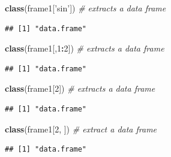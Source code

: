\documentclass[]{book}
\newenvironment{Shaded}{\begin{snugshade}}{\end{snugshade}}
\newcommand{\CommentTok}[1]{\textcolor[rgb]{0.56,0.35,0.01}{\textit{#1}}}
\newcommand{\DecValTok}[1]{\textcolor[rgb]{0.00,0.00,0.81}{#1}}
\newcommand{\KeywordTok}[1]{\textcolor[rgb]{0.13,0.29,0.53}{\textbf{#1}}}
\newcommand{\NormalTok}[1]{#1}
\newcommand{\OperatorTok}[1]{\textcolor[rgb]{0.81,0.36,0.00}{\textbf{#1}}}
\newcommand{\StringTok}[1]{\textcolor[rgb]{0.31,0.60,0.02}{#1}}
\theoremstyle{definition}
\theoremstyle{definition}
\theoremstyle{definition}
\theoremstyle{remark}
\begin{document}
\begin{Shaded}
\begin{Highlighting}[]
\KeywordTok{class}\NormalTok{(frame1[}\StringTok{'sin'}\NormalTok{])  }\CommentTok{# extracts a data frame}
\end{Highlighting}
\end{Shaded}

\begin{verbatim}
## [1] "data.frame"
\end{verbatim}

\begin{Shaded}
\begin{Highlighting}[]
\KeywordTok{class}\NormalTok{(frame1[,}\DecValTok{1}\OperatorTok{:}\DecValTok{2}\NormalTok{])  }\CommentTok{# extracts a data frame}
\end{Highlighting}
\end{Shaded}

\begin{verbatim}
## [1] "data.frame"
\end{verbatim}

\begin{Shaded}
\begin{Highlighting}[]
\KeywordTok{class}\NormalTok{(frame1[}\DecValTok{2}\NormalTok{])  }\CommentTok{# extracts a data frame}
\end{Highlighting}
\end{Shaded}

\begin{verbatim}
## [1] "data.frame"
\end{verbatim}

\begin{Shaded}
\begin{Highlighting}[]
\KeywordTok{class}\NormalTok{(frame1[}\DecValTok{2}\NormalTok{, ])  }\CommentTok{# extract a data frame}
\end{Highlighting}
\end{Shaded}

\begin{verbatim}
## [1] "data.frame"
\end{verbatim}

\begin{Shaded}
\end{Shaded}
\end{document}
